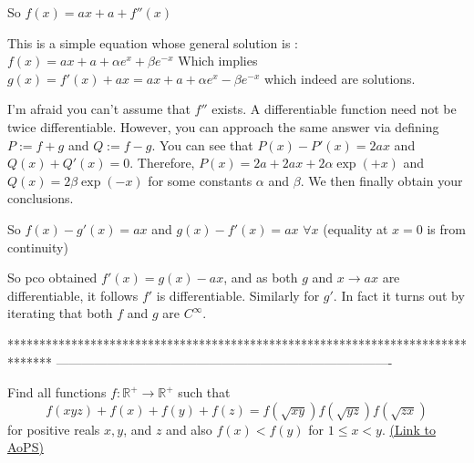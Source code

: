 \begin{solution}
	\begin{tcolorbox}
So $f(x)=ax+a+f''(x)$

This is a simple equation whose general solution is : $f(x)=ax+a+\alpha e^x+\beta e^{-x}$
Which implies $g(x)=f'(x)+ax=ax+a+\alpha e^x-\beta e^{-x}$ which indeed are solutions.
\end{tcolorbox}

I'm afraid you can't assume that $f''$ exists.  A differentiable function need not be twice differentiable.  However, you can approach the same answer via defining $P:=f+g$ and $Q:=f-g$.  You can see that $P(x)-P'(x) = 2ax$ and $Q(x)+Q'(x)=0$.  Therefore, $P(x)=2a+2ax+2\alpha\exp(+x)$ and $Q(x)=2\beta \exp(-x)$ for some constants $\alpha$ and $\beta$.  We then finally obtain your conclusions.
\end{solution}



\begin{solution}
	\begin{tcolorbox}So $f(x)-g'(x)=ax$ and $g(x)-f'(x)=ax$ $\forall x$ (equality at $x=0$ is from continuity)\end{tcolorbox}
So pco obtained $f'(x) = g(x) - ax$, and as both $g$ and $x \to ax$ are differentiable, it follows $f'$ is differentiable. Similarly for $g'$. In fact it turns out by iterating that both $f$ and $g$ are $C^{\infty}$.
\end{solution}
*******************************************************************************
-------------------------------------------------------------------------------

\begin{problem}
	Find all functions $f: \mathbb R^{+} \to \mathbb R^{+}$ such that \[f(xyz)+f(x)+f(y)+f(z)=f(\sqrt{xy})f(\sqrt{yz})f(\sqrt{zx})\]  for positive reals $x,y$, and $z$ and also $f(x) < f(y)$ for $1 \leq x <y$.
	\flushright \href{https://artofproblemsolving.com/community/c6h402541}{(Link to AoPS)}
\end{problem}



